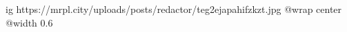  
 
 
 
 

\ifcmt
  ig https://mrpl.city/uploads/posts/redactor/teg2ejapahifzkzt.jpg
  @wrap center
  @width 0.6
\fi
